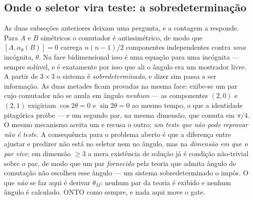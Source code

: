 \documentclass[11pt]{article}
\theoremstyle{definition}\newtheorem{deriv}{Derivação}
\begin{document}
\subsection*{Onde o seletor vira teste: a sobredetermina\c{c}\~ao}As duas subse\c{c}\~oes anteriores deixam uma pergunta, e a contagem a responde. Para $A$ e $B$ sim\'etricos o comutador \'e antissim\'etrico, de modo que $[A,\alpha_\theta(B)]=0$ carrega $n(n-1)/2$ componentes independentes contra \emph{uma} inc\'ognita, $\theta$. Na face bidimensional isso \'e uma equa\c{c}\~ao para uma inc\'ognita --- sempre sol\'uvel, e \'e exatamente por isso que ali o \^angulo era um mostrador livre. A partir de $3\times 3$ o sistema \'e \emph{sobredeterminado}, e dizer sim passa a ser informa\c{c}\~ao. As duas metades ficam provadas na mesma face: exibe-se um par cujo comutador n\~ao se anula em \^angulo \emph{nenhum} --- as componentes $(2,0)$ e $(2,1)$ exigiriam $\cos 2\theta = 0$ e $\sin 2\theta = 0$ ao mesmo tempo, o que a identidade pitag\'orica pro\'\i{}be --- e um segundo par, na mesma dimens\~ao, que comuta em $\pi/4$. O mesmo mecanismo aceita um e recusa o outro; \emph{um teste que n\~ao pode reprovar n\~ao \'e teste}. A consequ\^encia para o problema aberto \'e que a diferen\c{c}a entre ajustar e predizer n\~ao est\'a no seletor nem no \^angulo, mas na \emph{dimens\~ao em que o par vive}: em dimens\~ao $\geq 3$ a mera exist\^encia de solu\c{c}\~ao j\'a \'e condi\c{c}\~ao n\~ao-trivial sobre o par, de modo que um par \emph{fornecido} pela teoria que admita \^angulo de comuta\c{c}\~ao n\~ao escolheu esse \^angulo --- um sistema sobredeterminado o imp\^os. O que \emph{n\~ao} se faz aqui \'e derivar $\theta_M$: nenhum par da teoria \'e exibido e nenhum \^angulo \'e calculado. \textsf{ONTO} como sempre, e nada aqui move o gate.
\end{document}
